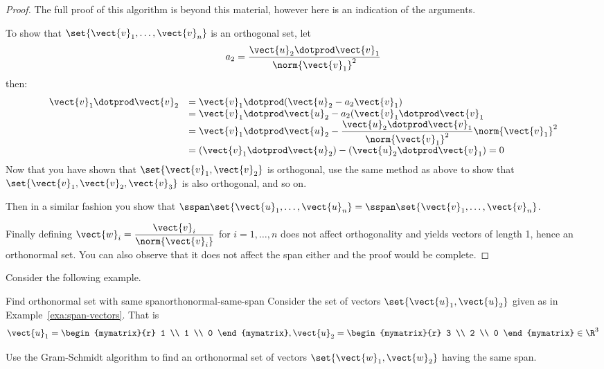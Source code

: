 \begin{proof}
The full proof of this algorithm is beyond this material, however here is an indication of the arguments.

To show that  $\set{\vect{v}_1,\ldots, \vect{v}_n  } $ is an orthogonal set, let
\[ a_2 =  \dfrac{ \vect{u}_2 \dotprod \vect{v}_1}{\norm{\vect{v}_1}^2} \]
then:
\[
\begin{array}{ll}
 \vect{v}_1 \dotprod \vect{v}_2 &  =  \vect{v}_1 \dotprod (\vect{u}_2 - a_2 \vect{v}_1)  \\
 & = \vect{v}_1 \dotprod \vect{u}_2 - a_2 (\vect{v}_1 \dotprod \vect{v}_1  \\
 & = \vect{v}_1 \dotprod \vect{u}_2 - \dfrac{ \vect{u}_2 \dotprod \vect{v}_1}{\norm{\vect{v}_1}^2} \norm{\vect{v}_1}^2 \\
 & = ( \vect{v}_1 \dotprod \vect{u}_2 ) - ( \vect{u}_2 \dotprod \vect{v}_1 ) =0\\
\end{array}
\]
Now that you have shown that $\set{\vect{v}_1, \vect{v}_2}$ is orthogonal,  use the same method as above to show that
$\set{\vect{v}_1, \vect{v}_2, \vect{v}_3}$ is also orthogonal,  and so on.

Then in a similar fashion you show that $\sspan\set{
\vect{u}_1,\ldots,\vect{u}_n } = \sspan\set{
\vect{v}_1,\ldots,\vect{v}_n }$.

Finally defining $\vect{w}_i =
\dfrac{\vect{v}_i}{\norm{\vect{v}_i}}$ for $i=1,\ldots,n$ does not affect orthogonality and yields vectors of length 1,
hence an orthonormal set. You can also observe that it does not affect
the span either and the proof would be complete.
\end{proof}

Consider the following example.

\begin{example}{Find orthonormal set with same span}{orthonormal-same-span}
Consider the set of vectors $\set{\vect{u}_1, \vect{u}_2}$ given as in Example~\ref{exa:span-vectors}. That is
\[
\vect{u}_1=\begin{mymatrix}{r}
1 \\
1 \\
0
\end{mymatrix}, \vect{u}_2=\begin{mymatrix}{r}
3 \\
2 \\
0
\end{mymatrix} \in \R^{3}
\]

Use the Gram-Schmidt algorithm to find an orthonormal set of vectors $\set{\vect{w}_1, \vect{w}_2}$ having the same span.
\end{example}

